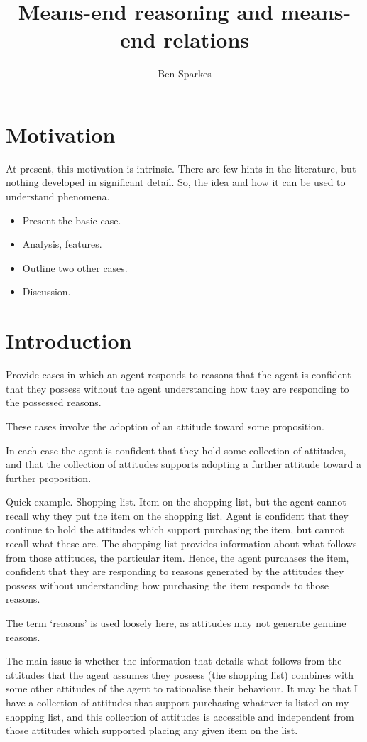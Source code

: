 \documentclass[10pt]{article}
\title{Means-end reasoning and means-end relations}
\author{Ben Sparkes}
\begin{document}

\section{Motivation}
\label{sec:motivation}

At present, this motivation is intrinsic.
There are few hints in the literature, but nothing developed in significant detail.
So, the idea and how it can be used to understand phenomena.

\begin{itemize}
\item Present the basic case.
\item Analysis, features.
\item Outline two other cases.
\item Discussion.
\end{itemize}

\section{Introduction}
\label{sec:introduction}

Provide cases in which an agent responds to reasons that the agent is confident that they possess without the agent understanding how they are responding to the possessed reasons.

These cases involve the adoption of an attitude toward some proposition.

In each case the agent is confident that they hold some collection of attitudes, and that the collection of attitudes supports adopting a further attitude toward a further proposition.

Quick example.
Shopping list.
Item on the shopping list, but the agent cannot recall why they put the item on the shopping list.
Agent is confident that they continue to hold the attitudes which support purchasing the item, but cannot recall what these are.
The shopping list provides information about what follows from those attitudes, the particular item.
Hence, the agent purchases the item, confident that they are responding to reasons generated by the attitudes they possess without understanding how purchasing the item responds to those reasons.

The term `reasons' is used loosely here, as attitudes may not generate genuine reasons.

The main issue is whether the information that details what follows from the attitudes that the agent assumes they possess (the shopping list) combines with some other attitudes of the agent to rationalise their behaviour.
It may be that I have a collection of attitudes that support purchasing whatever is listed on my shopping list, and this collection of attitudes is accessible and independent from those attitudes which supported placing any given item on the list.
\end{document}
